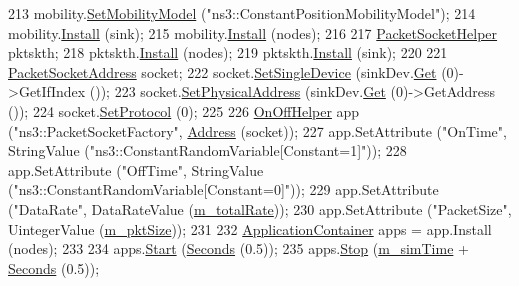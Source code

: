 \begin{DoxyCode}
213   mobility.\hyperlink{classns3_1_1MobilityHelper_a030275011b6f40682e70534d30280aba}{SetMobilityModel} (\textcolor{stringliteral}{"ns3::ConstantPositionMobilityModel"});
214   mobility.\hyperlink{classns3_1_1MobilityHelper_a07737960ee95c0777109cf2994dd97ae}{Install} (sink);
215   mobility.\hyperlink{classns3_1_1MobilityHelper_a07737960ee95c0777109cf2994dd97ae}{Install} (nodes);
216 
217   \hyperlink{classns3_1_1PacketSocketHelper}{PacketSocketHelper} pktskth;
218   pktskth.\hyperlink{classns3_1_1PacketSocketHelper_a33f449fee7fd10411949d17feba6d33e}{Install} (nodes);
219   pktskth.\hyperlink{classns3_1_1PacketSocketHelper_a33f449fee7fd10411949d17feba6d33e}{Install} (sink);
220 
221   \hyperlink{classns3_1_1PacketSocketAddress}{PacketSocketAddress} socket;
222   socket.\hyperlink{classns3_1_1PacketSocketAddress_ad1caa016f4d27c9d5f2c06dbfc53f8a3}{SetSingleDevice} (sinkDev.\hyperlink{classns3_1_1NetDeviceContainer_a677d62594b5c9d2dea155cc5045f4d0b}{Get} (0)->GetIfIndex ());
223   socket.\hyperlink{classns3_1_1PacketSocketAddress_a9452f9410a97e57344e464e25c2ab0f3}{SetPhysicalAddress} (sinkDev.\hyperlink{classns3_1_1NetDeviceContainer_a677d62594b5c9d2dea155cc5045f4d0b}{Get} (0)->GetAddress ());
224   socket.\hyperlink{classns3_1_1PacketSocketAddress_a9020962e39c238277f3b2f0de605647a}{SetProtocol} (0);
225 
226   \hyperlink{classns3_1_1OnOffHelper}{OnOffHelper} app (\textcolor{stringliteral}{"ns3::PacketSocketFactory"}, \hyperlink{classns3_1_1Address}{Address} (socket));
227   app.SetAttribute (\textcolor{stringliteral}{"OnTime"}, StringValue (\textcolor{stringliteral}{"ns3::ConstantRandomVariable[Constant=1]"}));
228   app.SetAttribute (\textcolor{stringliteral}{"OffTime"}, StringValue (\textcolor{stringliteral}{"ns3::ConstantRandomVariable[Constant=0]"}));
229   app.SetAttribute (\textcolor{stringliteral}{"DataRate"}, DataRateValue (\hyperlink{classExperiment_a5259793f074543984f6bcf15b8add220}{m\_totalRate}));
230   app.SetAttribute (\textcolor{stringliteral}{"PacketSize"}, UintegerValue (\hyperlink{classExperiment_ae73c947a54c222644fecfefd6d70b5a4}{m\_pktSize}));
231 
232   \hyperlink{classns3_1_1ApplicationContainer}{ApplicationContainer} apps = app.Install (nodes);
233 
234   apps.\hyperlink{classns3_1_1ApplicationContainer_a8eff87926507020bbe3e1390358a54a7}{Start} (\hyperlink{group__timecivil_ga33c34b816f8ff6628e33d5c8e9713b9e}{Seconds} (0.5));
235   apps.\hyperlink{classns3_1_1ApplicationContainer_adfc52f9aa4020c8714679b00bbb9ddb3}{Stop} (\hyperlink{classExperiment_a3440bfac76174e478b35aa810d17543c}{m\_simTime} + \hyperlink{group__timecivil_ga33c34b816f8ff6628e33d5c8e9713b9e}{Seconds} (0.5));

\end{DoxyCode}
